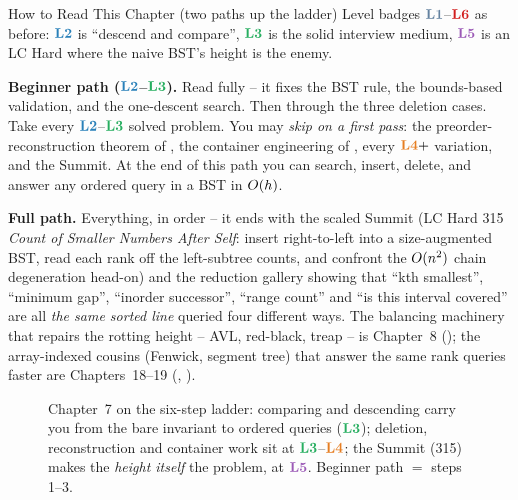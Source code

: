 \begin{chaptertheorybox}{How to Read This Chapter (two paths up the ladder)}
Level badges $\lv1$--$\lv6$ as before: $\lv2$ is ``descend and compare'', $\lv3$ is the solid
interview medium, $\lv5$ is an LC Hard where the naive BST's height is the enemy.

\textbf{Beginner path ($\lv2$--$\lv3$).} Read  fully -- it fixes the BST rule,
the bounds-based validation, and the one-descent search. Then  through the
three deletion cases. Take every $\lv2$--$\lv3$ solved problem. You may \emph{skip on a first
pass}: the preorder-reconstruction theorem of , the container engineering of
, every $\lv4{+}$ variation, and the Summit. At the end of this path you can
search, insert, delete, and answer any ordered query in a BST in $O(h)$.

\textbf{Full path.} Everything, in order -- it ends with the scaled Summit (LC Hard 315
\emph{Count of Smaller Numbers After Self}: insert right-to-left into a size-augmented BST, read
each rank off the left-subtree counts, and confront the $O(n^2)$ chain degeneration head-on)
and the reduction gallery showing that ``kth smallest'', ``minimum gap'', ``inorder successor'',
``range count'' and ``is this interval covered'' are all \emph{the same sorted line} queried four
different ways. The balancing machinery that repairs the rotting height -- AVL, red-black, treap
-- is Chapter~8 (); the array-indexed cousins (Fenwick, segment tree) that answer the
same rank queries faster are Chapters~18--19 (, ).
\end{chaptertheorybox}

\begin{figure}[H]
\centering
{}
\caption*{Chapter~7 on the six-step ladder: comparing and descending carry you from the bare
invariant to ordered queries ($\lv3$); deletion, reconstruction and container work sit at
$\lv3$--$\lv4$; the Summit (315) makes the \emph{height itself} the problem, at $\lv5$. Beginner
path $=$ steps 1--3.}
\end{figure}

